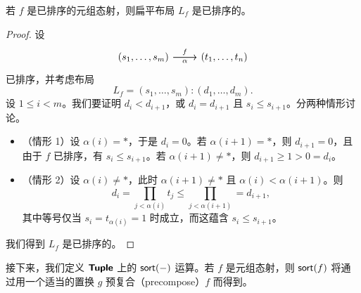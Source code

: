 \begin{proposition}\label{sortmorphisminCproposition}
    若 $f$ 是已排序的元组态射，则扁平布局 $L_f$ 是已排序的。 
\end{proposition}

\begin{proof}
    设
    \[\begin{tikzcd} (s_1,\dots,s_m) \ar[r,"f"] \ar[r,swap,"\alpha"] &  (t_1,\dots,t_n) \end{tikzcd} \]
    已排序，并考虑布局
    \[L_f = (s_1,\dots,s_m):(d_1,\dots,d_m).\] 设 $1 \leq i < m$。我们要证明 $d_i < d_{i+1}$，或 $d_i = d_{i+1}$ 且 $s_i \leq s_{i+1}$。分两种情形讨论。
    \begin{itemize} 
    \item （情形 1）设 $\alpha(i) = *$，于是 $d_i = 0$。若 $\alpha(i+1) = *$，则 $d_{i+1} = 0$，且由于 $f$ 已排序，有 $s_i \leq s_{i+1}$。若 $\alpha(i+1) \neq *$，则 $d_{i+1} \geq 1 > 0 = d_i$。 
    
    \item （情形 2）设 $\alpha(i) \neq *$，此时 $\alpha(i+1) \neq *$ 且 $\alpha(i) < \alpha(i+1)$。则
        \[
        d_i = \prod_{j<\alpha(i)}t_j \leq \prod_{j < \alpha(i+1)} = d_{i+1},
        \]
    其中等号仅当 $ s_i = t_{\alpha(i)} = 1$ 时成立，而这蕴含 $s_i \leq s_{i+1}$。
    \end{itemize} 
    我们得到 $L_f$ 是已排序的。
\end{proof}

\noindent 接下来，我们定义 ${\boldsymbol{\mathsf{Tuple}}}$ 上的 $\mathsf{sort}(-)$ 运算。若 $f$ 是元组态射，则 $\mathsf{sort}(f)$ 将通过用一个适当的置换 $g$ 预复合（precompose）$f$ 而得到。


